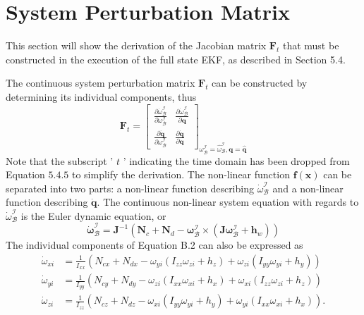 \chapter{System Perturbation Matrix}
\makeatletter{}\makeatother
\label{appen:derivations_bigramseg}

This section will show the derivation of the Jacobian matrix $\mathbf{F}_{t}$ that must be constructed in the execution of the full state EKF, as described in Section 5.4.

The continuous system perturbation matrix $\mathbf{F}_{t}$ can be constructed by determining its individual components, thus
$$
\mathbf{F}_{t}=\left[\begin{array}{ll}
\frac{\partial \dot{\omega}_{\mathcal{B}}^{\mathcal{I}}}{\partial \omega_{\mathcal{B}}^{\mathcal{I}}} & \frac{\partial \dot{\omega}_{\mathcal{B}}^{\mathcal{I}}}{\partial \mathbf{q}} \\
\frac{\partial \dot{\mathbf{q}}}{\partial \omega_{\mathcal{B}}^{\mathcal{I}}} & \frac{\partial \dot{\mathbf{q}}}{\partial \mathbf{q}}
\end{array}\right]_{\omega_{\mathcal{B}}^{\mathcal{I}}=\hat{\omega}_{\mathcal{B}}^{\mathcal{I}}, \mathbf{q}=\hat{\mathbf{q}}}
$$
Note that the subscript ' $t$ ' indicating the time domain has been dropped from Equation $5.4 .5$ to simplify the derivation. The non-linear function $\boldsymbol{f}(\mathbf{x})$ can be separated into two parts: a non-linear function describing $\dot{\omega}_{\mathcal{B}}^{\mathcal{I}}$ and a non-linear function describing $\dot{\mathbf{q}}$. The continuous non-linear system equation with regards to $\dot{\omega}_{\mathcal{B}}^{\mathcal{I}}$ is the Euler dynamic equation, or
$$
\dot{\boldsymbol{\omega}}_{\mathcal{B}}^{\mathcal{I}}=\mathbf{J}^{-1}\left(\mathbf{N}_{c}+\mathbf{N}_{d}-\boldsymbol{\omega}_{\mathcal{B}}^{\mathcal{I}} \times\left(\mathbf{J} \boldsymbol{\omega}_{\mathcal{B}}^{\mathcal{I}}+\mathbf{h}_{w}\right)\right)
$$
The individual components of Equation B.2 can also be expressed as
$$
\begin{aligned}
\dot{\omega}_{x i} &=\frac{1}{I_{x x}}\left(N_{c x}+N_{d x}-\omega_{y i}\left(I_{z z} \omega_{z i}+h_{z}\right)+\omega_{z i}\left(I_{y y} \omega_{y i}+h_{y}\right)\right) \\
\dot{\omega}_{y i} &=\frac{1}{I_{y y}}\left(N_{c y}+N_{d y}-\omega_{z i}\left(I_{x x} \omega_{x i}+h_{x}\right)+\omega_{x i}\left(I_{z z} \omega_{z i}+h_{z}\right)\right) \\
\dot{\omega}_{z i} &=\frac{1}{I_{z z}}\left(N_{c z}+N_{d z}-\omega_{x i}\left(I_{y y} \omega_{y i}+h_{y}\right)+\omega_{y i}\left(I_{x x} \omega_{x i}+h_{x}\right)\right) .
\end{aligned}
$$
